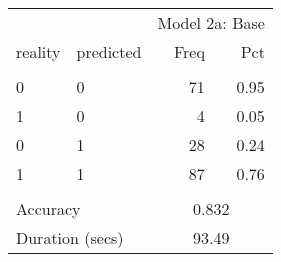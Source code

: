\begin{tabular}{llrr}
   \toprule 
 & & 
                        \multicolumn{2}{l}{Model 2a: Base} 
                        \\ 
 \cmidrule(lr){3-4} 
                        
  reality & predicted & 
                        Freq & Pct 
                        \\ \hline \\[-1.8ex]  
 0 & 0 &  71 & 0.95 \\ 
  1 & 0 &   4 & 0.05 \\ 
  0 & 1 &  28 & 0.24 \\ 
  1 & 1 &  87 & 0.76 \\ 
   \hline \\[-1.8ex]  

              \multicolumn{2}{l}{Accuracy} & 
                   \multicolumn{2}{c}{0.832}
                   \\ 
 
                   \multicolumn{2}{l}{Duration (secs)} & 
                   \multicolumn{2}{c}{93.49}
                   \\ 
 \bottomrule 
\end{tabular}
